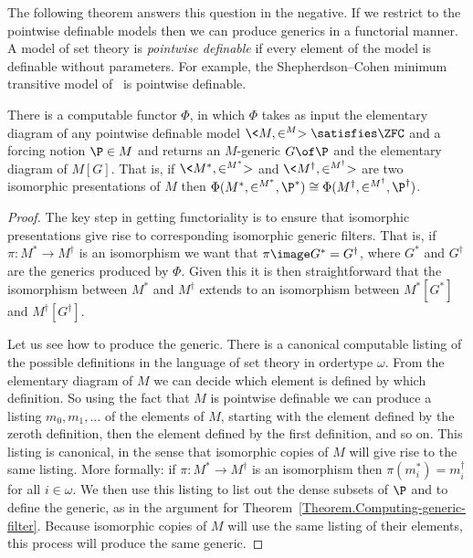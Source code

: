 \documentclass{amsart}
\begin{document}
The following theorem answers this question in the negative. If we restrict to the pointwise definable models then we can produce generics in a functorial manner. A model of set theory is \emph{pointwise definable} if every element of the model is definable without parameters. For example, the Shepherdson--Cohen minimum transitive model of \ZF\ is pointwise definable.

\begin{theorem}
There is a computable functor $\Phi$, in which $\Phi$ takes as input the elementary diagram of any pointwise definable model $\<M,\in^M> \satisfies \ZFC$ and a forcing notion $\P \in M$ and returns an $M$-generic $G \of \P$ and the elementary diagram of $M[G]$. That is, if $\<M^*,\in^{M^*}>$ and $\<M^\dagger,\in^{M^\dagger}>$ are two isomorphic presentations of $M$ then $\Phi(M^*,\in^{M^*},\P^*) \cong \Phi(M^\dagger,\in^{M^\dagger},\P^\dagger)$.
\end{theorem}

\begin{proof}
The key step in getting functoriality is to ensure that isomorphic presentations give rise to corresponding isomorphic generic filters. That is, if $\pi : M^* \to M^\dagger$ is an isomorphism we want that $\pi\image G^* = G^\dagger$, where $G^*$ and $G^\dagger$ are the generics produced by $\Phi$. Given this it is then straightforward that the isomorphism between $M^*$ and $M^\dagger$ extends to an isomorphism between $M^*[G^*]$ and $M^\dagger[G^\dagger]$.

Let us see how to produce the generic. There is a canonical computable listing of the possible definitions in the language of set theory in ordertype $\omega$. From the elementary diagram of $M$ we can decide which element is defined by which definition. So using the fact that $M$ is pointwise definable we can produce a listing $m_0, m_1, \ldots$ of the elements of $M$, starting with the element defined by the zeroth definition, then the element defined by the first definition, and so on. This listing is canonical, in the sense that isomorphic copies of $M$ will give rise to the same listing. More formally: if $\pi : M^* \to M^\dagger$ is an isomorphism then $\pi(m_i^*) = m_i^\dagger$ for all $i \in \omega$. We then use this listing to list out the dense subsets of $\P$ and to define the generic, as in the argument for Theorem~\ref{Theorem.Computing-generic-filter}. Because isomorphic copies of $M$ will use the same listing of their elements, this process will produce the same generic.
\end{proof}
\end{document}
